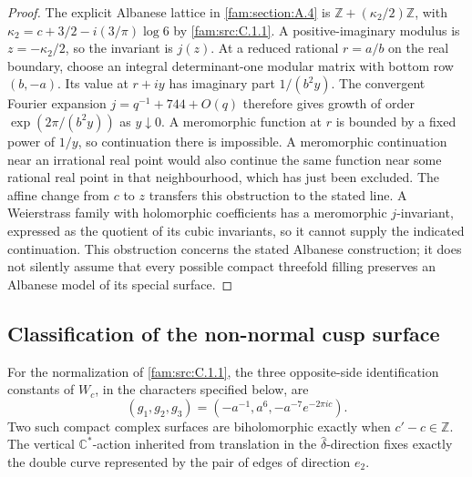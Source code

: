 \begin{proof}
The explicit Albanese lattice in \ref{fam:section:A.4} is
$\mathbb Z+(\kappa_2/2)\mathbb Z$, with
$\kappa_2=c+3/2-i(3/\pi)\log6$ by \ref{fam:src:C.1.1}. A positive-imaginary modulus is
$z=-\kappa_2/2$, so the invariant is $j(z)$. At a reduced rational
$r=a/b$ on the real boundary, choose an integral determinant-one modular
matrix with bottom row $(b,-a)$. Its value at $r+iy$ has imaginary part
$1/(b^2y)$. The convergent Fourier expansion $j=q^{-1}+744+O(q)$ therefore
gives growth of order $\exp(2\pi/(b^2y))$ as $y\downarrow0$.
A meromorphic function at $r$ is bounded by a fixed power of $1/y$,
so continuation there is impossible. A meromorphic continuation near an
irrational real point would also continue the same function near some
rational real point in that neighbourhood, which has just been excluded.
The affine change from $c$ to $z$ transfers this obstruction to the
stated line. A Weierstrass family with holomorphic coefficients has a
meromorphic $j$-invariant, expressed as the quotient of its cubic
invariants, so it cannot supply the indicated continuation. This
obstruction concerns the stated Albanese construction; it does not
silently assume that every possible compact threefold filling preserves
an Albanese model of its special surface.
\end{proof}

\subsection{Classification of the non-normal cusp surface}\label{fam:section:C.4}
\begin{theorem}\label{fam:src:C.4.1}\label{fam:st:C.4.1}
For the normalization of \ref{fam:src:C.1.1}, the three opposite-side identification
constants of \(W_c\), in the characters specified below, are
\[
 (g_1,g_2,g_3)=(-a^{-1},a^6,-a^{-7}e^{-2\pi ic}).
\]
Two such compact complex surfaces are biholomorphic exactly when
\(c'-c\in\mathbb Z\). The vertical \(\mathbb C^*\)-action inherited from
translation in the \(\widehat\delta\)-direction fixes exactly the double
curve represented by the pair of edges of direction \(e_2\).
\end{theorem}

